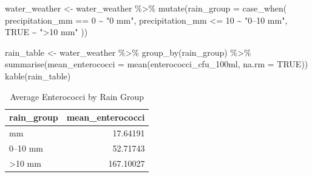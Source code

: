 \documentclass[
  11pt,
]{article}
\newenvironment{Shaded}{\begin{snugshade}}{\end{snugshade}}
\newcommand{\AttributeTok}[1]{\textcolor[rgb]{0.40,0.45,0.13}{#1}}
\newcommand{\ConstantTok}[1]{\textcolor[rgb]{0.56,0.35,0.01}{#1}}
\newcommand{\DecValTok}[1]{\textcolor[rgb]{0.68,0.00,0.00}{#1}}
\newcommand{\FunctionTok}[1]{\textcolor[rgb]{0.28,0.35,0.67}{#1}}
\newcommand{\NormalTok}[1]{\textcolor[rgb]{0.00,0.23,0.31}{#1}}
\newcommand{\OtherTok}[1]{\textcolor[rgb]{0.00,0.23,0.31}{#1}}
\newcommand{\SpecialCharTok}[1]{\textcolor[rgb]{0.37,0.37,0.37}{#1}}
\newcommand{\StringTok}[1]{\textcolor[rgb]{0.13,0.47,0.30}{#1}}
\begin{document}
\begin{Shaded}
\begin{Highlighting}[]
\NormalTok{water\_weather }\OtherTok{\textless{}{-}}\NormalTok{ water\_weather }\SpecialCharTok{\%\textgreater{}\%}
  \FunctionTok{mutate}\NormalTok{(}\AttributeTok{rain\_group =} \FunctionTok{case\_when}\NormalTok{(}
\NormalTok{    precipitation\_mm }\SpecialCharTok{==} \DecValTok{0} \SpecialCharTok{\textasciitilde{}} \StringTok{"0 mm"}\NormalTok{,}
\NormalTok{    precipitation\_mm }\SpecialCharTok{\textless{}=} \DecValTok{10} \SpecialCharTok{\textasciitilde{}} \StringTok{"0–10 mm"}\NormalTok{,}
    \ConstantTok{TRUE} \SpecialCharTok{\textasciitilde{}} \StringTok{"\textgreater{}10 mm"}
\NormalTok{  ))}
\end{Highlighting}
\end{Shaded}

\begin{Shaded}
\begin{Highlighting}[]
\NormalTok{rain\_table }\OtherTok{\textless{}{-}}\NormalTok{ water\_weather }\SpecialCharTok{\%\textgreater{}\%}
  \FunctionTok{group\_by}\NormalTok{(rain\_group) }\SpecialCharTok{\%\textgreater{}\%}
  \FunctionTok{summarise}\NormalTok{(}\AttributeTok{mean\_enterococci =} \FunctionTok{mean}\NormalTok{(enterococci\_cfu\_100ml, }\AttributeTok{na.rm =} \ConstantTok{TRUE}\NormalTok{))}
\FunctionTok{kable}\NormalTok{(rain\_table)}
\end{Highlighting}
\end{Shaded}

\begin{longtable}[]{@{}lr@{}}

\caption{\label{tbl-rain_table}Average Enterococci by Rain Group}

\tabularnewline

\toprule\noalign{}
rain\_group & mean\_enterococci \\
\midrule\noalign{}
\endhead
\bottomrule\noalign{}
\endlastfoot
0 mm & 17.64191 \\
0--10 mm & 52.71743 \\
\textgreater10 mm & 167.10027 \\

\end{longtable}
\end{document}
